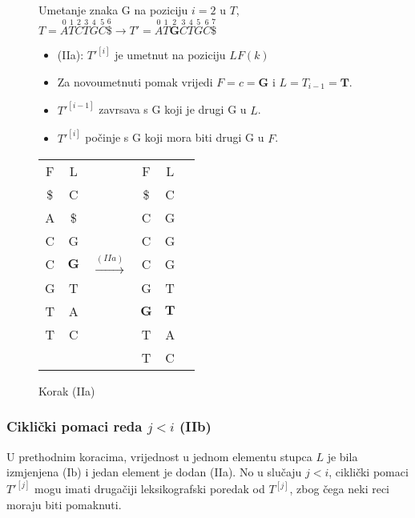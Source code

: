\documentclass{ferseminar}
\begin{document}
\begin{figure}[H]

\begin{minipage}{0.5\textwidth}
\footnotesize
Umetanje znaka G na poziciju $i=2$ u $T$,
$
	T=\overset{0}{A}	\overset{1}{T} \overset{2}{C} \overset{3}{T}	\overset{4}{G}
	\overset{5}{C}	\overset{6}{\$} \rightarrow		
	T'=\overset{0}{A}	\overset{1}{T}	\overset{2}{\boldsymbol{G}}  \overset{3}{C} \overset{4}{T}	\overset{5}{G}
	\overset{6}{C}	\overset{7}{\$} 	
$
\begin{itemize}
  \item[] (IIa): $T'^{[i]}$ je umetnut na poziciju $LF(k)$
  \item[] Za novoumetnuti pomak vrijedi $F=c=\boldsymbol{G}$ i $L=T_{i-1}=\boldsymbol{T}$.
  \item[] $T'^{[i-1]}$ zavrsava s G koji je drugi G u $L$.
  \item[] $T'^{[i]}$ počinje s G koji mora biti drugi G u $F$.
\end{itemize}

\end{minipage} \hfill
\begin{minipage}{0.45\textwidth}
\hspace{.2\textwidth}
\begin{tabular}{cccc|cc}
	\multicolumn{1}{c|}{F} & L & & F & L \\
	\cline{1-2}	\cline{4-5}
	\multicolumn{1}{c|}{\$} & C & & \$ & C \\
	\multicolumn{1}{c|}{A} & \$ & & C & G \\
	\multicolumn{1}{c|}{C} & G &  & C & G \\
	\multicolumn{1}{c|}{C} & $\boldsymbol{G}$ & $\stackrel{(IIa)}{\longrightarrow}$ & C & G \\
	
	\multicolumn{1}{c|}{G} & T &  & G & T \\
	\cline{4-5}
	\multicolumn{1}{c|}{T} & A & & \multicolumn{1}{|c|}{$\boldsymbol{G}$} & \multicolumn{1}{c|}{$\boldsymbol{T}$} \\
	\cline{4-5}
	\multicolumn{1}{c|}{T} & C & & T & A \\
	  &   & & T & C
\end{tabular}

\end{minipage}
\caption{Korak (IIa)}
\label{slika:dva}
\end{figure}



\subsubsection{Ciklički pomaci reda $j<i$ (IIb)}
U prethodnim koracima, vrijednost u jednom elementu stupca $L$ je bila izmjenjena (Ib) i jedan element je dodan (IIa). No u slučaju $j<i$, ciklički pomaci $T'^{[j]}$ mogu imati drugačiji leksikografski poredak od $T^{[j]}$, zbog čega neki reci moraju biti pomaknuti.
\end{document}
